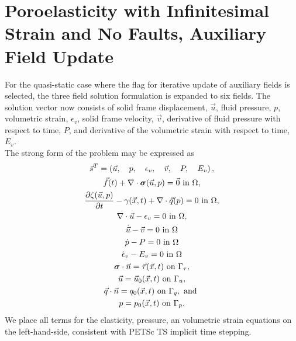 \section{Poroelasticity with Infinitesimal Strain and No Faults, Auxiliary Field Update}

For the quasi-static case where the flag for iterative update of auxiliary fields is
selected, the three field solution formulation is expanded to six fields. The solution
vector now consists of solid frame displacement, $\vec{u}$, fluid pressure, $p$, volumetric
strain, $\epsilon_{v}$, solid frame velocity, $\vec{v}$, derivative of fluid pressure with
respect to time, $P$, and derivative of the volumetric strain with respect to time,
$E_{v}$.\\

The strong form of the problem may be expressed as
\begin{gather}
    \vec{s}^{T} = \left(\vec{u}, \quad p, \quad \epsilon_v, \quad \vec{v}, \quad P, \quad E_{v} \right), \\
    \vec{f}(t) + \nabla \cdot \bm{\sigma}(\vec{u},p) = \vec{0} \text{ in } \Omega, \\
    \frac{\partial \zeta(\vec{u},p)}{\partial t} - \gamma(\vec{x},t) + \nabla \cdot \vec{q}(p) = 0 \text{ in } \Omega, \\
    \nabla \cdot \vec{u} - \epsilon_{v} = 0 \text{ in } \Omega, \\
    \dot{\vec{u}} -\vec{v} = 0 \text{ in } \Omega \\
    \dot{p} - P = 0 \text{ in } \Omega \\
    \dot{\epsilon}_{v} - E_{v} = 0 \text{ in } \Omega \\
    \bm{\sigma} \cdot \vec{n} = \vec{\tau}(\vec{x},t) \text{ on } \Gamma_{\tau}, \\
    \vec{u} = \vec{u}_0(\vec{x}, t) \text{ on } \Gamma_{u}, \\
    \vec{q} \cdot \vec{n} = q_0(\vec{x}, t) \text{ on } \Gamma_{q}, \text{ and } \\
    p = p_0(\vec{x},t) \text{ on } \Gamma_{p}.
\end{gather}
We place all terms for the elasticity, pressure, an volumetric strain
equations on the left-hand-side, consistent with PETSc TS implicit
time stepping.

